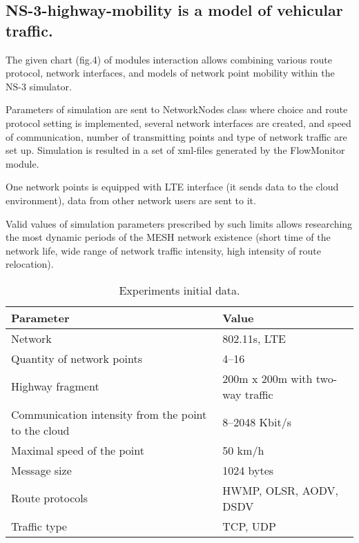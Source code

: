 \documentclass[a4paper,twoside]{article}
\begin{document}
\subsection{NS-3-highway-mobility is a model of vehicular traffic.}
The given chart (fig.4) of modules interaction allows combining various route protocol, network interfaces, and models of network point mobility within the NS-3 simulator. 

Parameters of simulation are sent to NetworkNodes class where choice and route protocol setting is implemented, several network interfaces are created, and speed of communication, number of transmitting points and type of network traffic are set up. Simulation is resulted in a set of xml-files generated by the FlowMonitor module.

One network points is equipped with LTE interface (it sends data to the cloud environment), data from other network users are sent to it. 

Valid values of simulation parameters prescribed by such limits allows researching the most dynamic periods of the MESH network existence (short time of the network life, wide range of network traffic intensity, high intensity of route relocation).

\begin{table}[!ht]
\caption{Experiments initial data.}\label{tab:initialdata} \centering
\begin{tabular}{ p{3.28cm} | p{3.28cm}}
  \hline
  Parameter & Value \\
  \hline  \hline
  Network & 802.11s, LTE \\
  \hline
  Quantity of network points & 4--16 \\
  \hline
  Highway fragment & 200m x 200m with two-way traffic \\
  \hline
  Communication intensity from the point to the cloud & 8--2048 Kbit/s \\
  \hline
  Maximal speed of the point & 50 km/h \\
  \hline
  Message size & 1024 bytes \\
  \hline
  Route protocols & HWMP, OLSR, AODV, DSDV \\
  \hline
  Traffic type & TCP, UDP \\
  \hline
\end{tabular}
\end{table}

\begin{figure*}[!ht]
  \vspace{-0.2cm}
  \vspace{-0.1cm}
\end{figure*}
\end{document}
